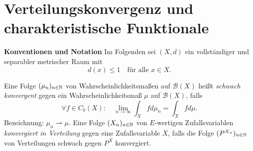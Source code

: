 \section{Verteilungskonvergenz und charakteristische Funktionale}
\textbf{Konventionen und Notation} 
\newline 
Im Folgenden sei $(X,d)$ ein vollständiger und separabler metrischer Raum mit
$$d(x) \leq 1 \quad \text{für alle } x \in X.$$ 

\begin{mydef}
    Eine Folge $(\mu_n)_{n \in \mathbb{N}}$ von Wahrscheinlichkeitsmaßen auf $\mathcal{B}(X)$ heißt \textit{schwach konvergent} 
    gegen ein Wahrscheinlichkeitsmaß $\mu$ auf $\mathcal{B}(X)$, falls 
    $$
        \forall f \in C_b(X): \quad \lim_{n \to \infty} \int_Xfd\mu_n = \int_X fd\mu . 
    $$
    Bezeichnung: $\mu_n \rightharpoonup \mu$. 
    \newline
    Eine Folge $(X_n)_{n \in \mathbb{N}}$ von $E$-wertigen Zufallsvariablen \textit{konvergiert in Verteilung} gegen eine Zufallsvariable $X$,
    falls die Folge $(P^{X_n})_{n \in \mathbb{N}}$ von Verteilungen schwach gegen $P^X$ konvergiert. 
\end{mydef}



